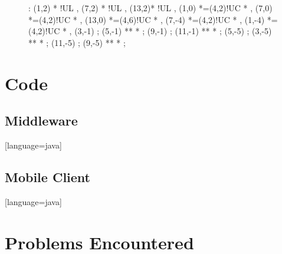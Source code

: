 \documentclass[a4paper,12pt]{article}
\begin{document}
\begin{figure}[hp]
\xy<1cm,0cm>:
\POS (1,2) * !UL ,
\POS (7,2) * !UL ,
\POS (13,2)* !UL ,
(1,0) *=(4,2)!UC *\frm{-} ,
(7,0) *=(4,2)!UC *\frm{-} ,
(13,0) *=(4,6)!UC *\frm{-} ,
(7,-4) *=(4,2)!UC *\frm{-} ,
(1,-4) *=(4,2)!UC *\frm{-} ,
(3,-1) ; (5,-1)  **\dir{-}  *\dir{>} ;
(9,-1) ; (11,-1) **\dir{-} *\dir{>} ;
(5,-5)  ; (3,-5) **\dir{-}  *\dir{>} ;
(11,-5) ; (9,-5) **\dir{-} *\dir{>} ;
\endxy

\end{figure}

\section{Code}

\subsection{Middleware}

\lstset{breaklines=true,tabsize=3,basicstyle=\ttfamily}
[language=java]

\subsection{Mobile Client}

\lstset{breaklines=true,tabsize=3,basicstyle=\ttfamily}
[language=java]

\section{Problems Encountered}
\end{document}
